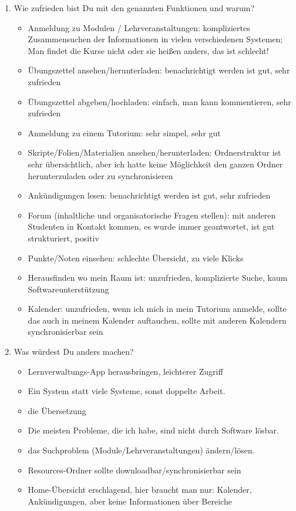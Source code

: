 \documentclass{article}
\begin{document}
\begin{enumerate}
\item Wie zufrieden bist Du mit den genannten Funktionen und warum?
\begin{itemize}
\item Anmeldung zu Modulen / Lehrveranstaltungen: kompliziertes Zusammensuchen der Informationen in vielen verschiedenen Systemen; Man findet die Kurse nicht oder sie heißen anders, das ist schlecht!
\item Übungszettel ansehen/herunterladen: benachrichtigt werden ist gut, sehr zufrieden
\item Übungszettel abgeben/hochladen: einfach, man kann kommentieren, sehr zufrieden
\item Anmeldung zu einem Tutorium: sehr simpel, sehr gut
\item Skripte/Folien/Materialien ansehen/herunterladen: Ordnerstruktur ist sehr übersichtlich, aber ich hatte keine Möglichkeit den ganzen Ordner herunterzuladen oder zu synchronisieren
\item Ankündigungen lesen: benachrichtigt werden ist gut, sehr zufrieden
\item Forum (inhaltliche und organisatorische Fragen stellen): mit anderen Studenten in Kontakt kommen, es wurde immer geantwortet, ist gut strukturiert, positiv
\item Punkte/Noten einsehen: schlechte Übersicht, zu viele Klicks
\item Herausfinden wo mein Raum ist: unzufrieden, komplizierte Suche, kaum Softwareunterstützung
\item Kalender: unzufrieden, wenn ich mich in mein Tutorium anmelde, sollte das auch in meinem Kalender auftauchen, sollte mit anderen Kalendern synchronisierbar sein
\end{itemize}

\item Was würdest Du anders machen?
\begin{itemize}
\item Lernverwaltungs-App herausbringen, leichterer Zugriff
\item Ein System statt viele Systeme, sonst doppelte Arbeit.
\item die Übersetzung
\item Die meisten Probleme, die ich habe, sind nicht durch Software lösbar.
\item das Suchproblem (Module/Lehrveranstaltungen) ändern/lösen.
\item Resources-Ordner sollte downloadbar/synchronisierbar sein
\item Home-Übersicht erschlagend, hier braucht man nur: Kalender, Ankündigungen, aber keine Informationen über Bereiche
\end{itemize}


\end{enumerate}
\end{document}
